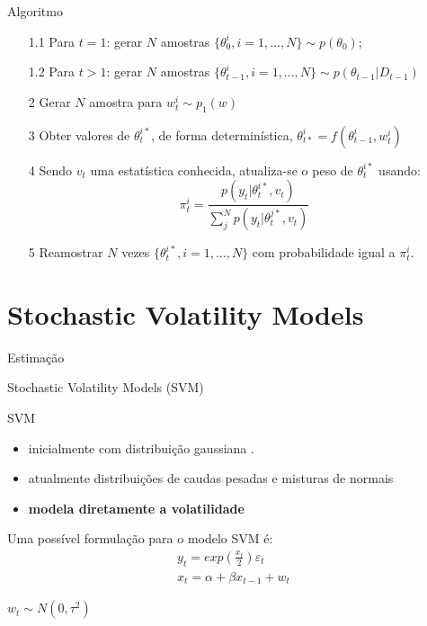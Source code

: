 \documentclass{beamer}
\begin{document}
\begin{frame}{Algoritmo}

\begin{itemize}
\item[1.1] Para $t=1$: gerar $N$ amostras $\{\theta_{0}^{i}, i= 1,...,N\} \sim p(\theta_0)$;
\item[1.2] Para $t>1$: gerar $N$ amostras $\{\theta_{t-1}^{i}, i= 1,...,N\}\sim p(\theta_{t-1}|D_{t-1})$
\end{itemize}
\begin{itemize}
\item[2] Gerar $N$ amostra para $w_{t}^{i} \sim p_1(w)$
\item[3] Obter valores de $\theta^{i*}_{t}$, de forma determinística, $\theta_{t*}^{i} = f(\theta_{t-1}^{i},w_{t}^{i})$
\item[4] Sendo $v_t$ uma estatística conhecida, atualiza-se o peso de $\theta^{i*}_{t}$ usando:
$$
\pi^{i}_t = \frac{p(y_t|\theta_t^{i*},v_t)}{\sum^N_j p(y_t|\theta_t^{j*},v_t)}
$$
\item[5] Reamostrar $N$ vezes $\{\theta_{t}^{i*}, i= 1,...,N\}$ com probabilidade igual a $\pi_{t}^{i}$.
\end{itemize}

\end{frame}



\section{Stochastic Volatility Models}
\begin{frame}{Estimação}
    \begin{block}{ }
      \Huge  Stochastic Volatility Models (SVM)
    \end{block}
\end{frame}





\begin{frame}{SVM}

\begin{itemize}
\item inicialmente com distribuição gaussiana \citep{HULL1987}.
\item atualmente distribuições de caudas pesadas e misturas de normais \citep{Virbickaite2016}
\item \textbf{modela diretamente a volatilidade}
\end{itemize}

Uma possível formulação para o modelo SVM é:
\begin{eqnarray}
y_t = exp\left(\frac{x_t}{2}\right)\varepsilon_t \nonumber \\
x_t = \alpha +  \beta x_{t-1} + w_t
\end{eqnarray}

$w_t \sim N(0,\tau^2)$

\end{frame}
\end{document}
